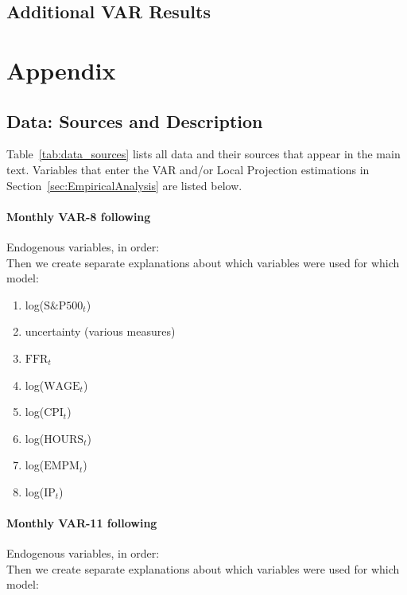 \documentclass[a4paper,11pt,listof=nochaptergap,oneside,pointednumbers,bibtotoc,bigheadings,liststotoc]{scrbook}
\theoremstyle{mysatz}
\theoremstyle{mydefinition}
\theoremstyle{mybemerkung}
\renewcommand*{\paragraph}[1]{\subsubsection*{#1} \vspace{-3mm}} %
\begin{document}
\section{Additional VAR Results}




\chapter{Appendix}
\label{DataAndCode}
\section{Data: Sources and Description}
\label{sec:data}
Table~\ref{tab:data_sources} lists all data and their sources that appear in the main text. Variables that enter the VAR and/or Local Projection estimations in Section~\ref{sec:EmpiricalAnalysis} are listed below.


\paragraph{Monthly VAR-8 following \citet{bloom:09}} Endogenous variables, in order:\\
Then we create separate explanations about which variables were used for which model:\\

\begingroup
\begin{spacing}{0.5}
    \fontsize{10pt}{12pt}\selectfont
\begin{enumerate}
	\item log($\text{S\&P500}_t$)
	\item uncertainty (various measures)
	\item $\text{FFR}_t$
	\item log($\text{WAGE}_t$)
	\item log($\text{CPI}_t$)
	\item log($\text{HOURS}_t$)
	\item log($\text{EMPM}_t$)	
	\item log($\text{IP}_t$)		
\end{enumerate}
\end{spacing}
\endgroup



\paragraph{Monthly VAR-11 following \citet{juradoetal:15}} Endogenous variables, in order:\\
Then we create separate explanations about which variables were used for which model:\\
\end{document}
